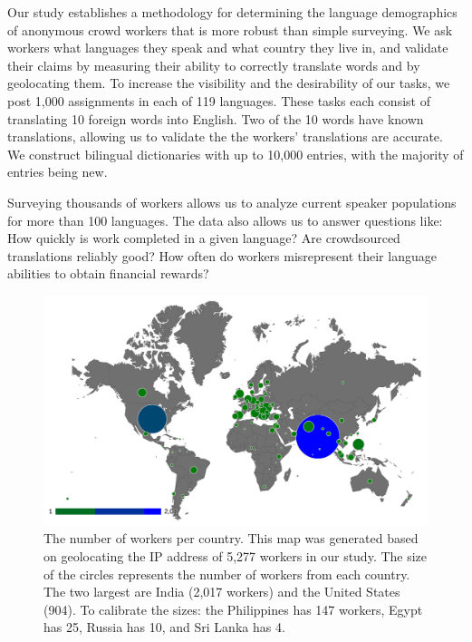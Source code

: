 \documentclass[11pt]{article}
\begin{document}
Our study establishes a methodology for determining the language demographics of anonymous crowd workers that is more robust than simple surveying. We ask workers what languages they speak and what country they live in, and validate their claims by measuring their ability to correctly translate words and by geolocating them.  To increase the visibility and the desirability of our tasks, we post 1,000 assignments in each of 119 languages.  These tasks each consist of translating 10 foreign words into English.  Two of the 10 words have known translations, allowing us to validate the the workers' translations are accurate.  We construct bilingual dictionaries with up to 10,000 entries, with the majority of entries being new. 

Surveying thousands of workers allows us to analyze current speaker populations for more than 100 languages.  The data also allows us to answer questions like: 
How quickly is work completed in a given language? 
Are crowdsourced translations reliably good? 
How often do workers misrepresent their language abilities to obtain financial rewards? 

\begin{figure}[h]
\centering
\includegraphics[width=\linewidth]{final-figures/turkermap}
\caption{The number of workers per country.  This map was generated based on geolocating the IP address of  5,277 workers in our study.  The size of the circles represents the number of workers from each country.  The two largest are India (2,017 workers) and the United States (904).  To calibrate the sizes: the Philippines has 147 workers, Egypt has 25, Russia has 10, and Sri Lanka has 4.}
\label{map}
\end{figure}
\end{document}
